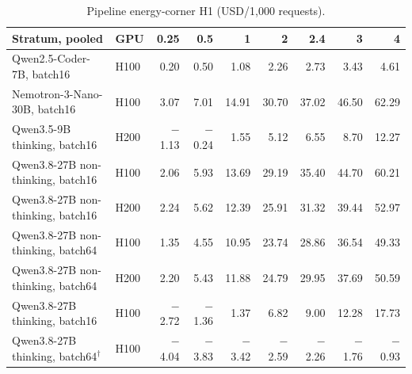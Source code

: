 
\begin{table}[t]
\caption{Pipeline energy-corner H1 (USD/1,000 requests).}
\label{tab:energy-box}
\centering\small
\begin{tabular}{llrrrrrrr}
\toprule
Stratum, pooled & GPU & 0.25 & 0.5 & 1 & 2 & 2.4 & 3 & 4 \\
\midrule
Qwen2.5-Coder-7B, batch16 & H100 & 0.20 & 0.50 & 1.08 & 2.26 & 2.73 & 3.43 & 4.61 \\
Nemotron-3-Nano-30B, batch16 & H100 & 3.07 & 7.01 & 14.91 & 30.70 & 37.02 & 46.50 & 62.29 \\
Qwen3.5-9B thinking, batch16 & H200 & $-$1.13 & $-$0.24 & 1.55 & 5.12 & 6.55 & 8.70 & 12.27 \\
Qwen3.8-27B non-thinking, batch16 & H100 & 2.06 & 5.93 & 13.69 & 29.19 & 35.40 & 44.70 & 60.21 \\
Qwen3.8-27B non-thinking, batch16 & H200 & 2.24 & 5.62 & 12.39 & 25.91 & 31.32 & 39.44 & 52.97 \\
Qwen3.8-27B non-thinking, batch64 & H100 & 1.35 & 4.55 & 10.95 & 23.74 & 28.86 & 36.54 & 49.33 \\
Qwen3.8-27B non-thinking, batch64 & H200 & 2.20 & 5.43 & 11.88 & 24.79 & 29.95 & 37.69 & 50.59 \\
Qwen3.8-27B thinking, batch16 & H100 & $-$2.72 & $-$1.36 & 1.37 & 6.82 & 9.00 & 12.28 & 17.73 \\
Qwen3.8-27B thinking, batch64$^\dagger$ & H100 & $-$4.04 & $-$3.83 & $-$3.42 & $-$2.59 & $-$2.26 & $-$1.76 & $-$0.93 \\
\bottomrule
\end{tabular}
\end{table}
